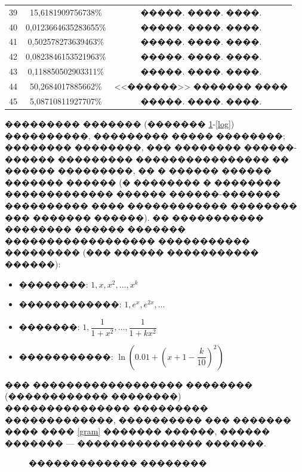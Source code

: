 \documentclass[a4paper]{article}
\begin{document}
\begin{table}[h]
\begin{center}
\begin{tabular}[t]{|c|c|c|}
      39       & 15,6181909756738\%     & �����. ����. ����.   \\
      40       & 0,0123664635283655\%   & �����. ����. ����.   \\
      41       & 0,502578273639463\%    & �����. ����. ����.   \\
      42       & 0,0823846153521963\%   & �����. ����. ����.   \\
      43       & 0,118850502903311\%    & �����. ����. ����.   \\
      44       & 50,2684017885662\%     & <<������>> ������� ����   \\
      45       & 5,08710811927707\%     & �����. ����. ����.   \\
      \hline
    \end{tabular}
  \end{center}
\end{table}



��������� ������� (������� \ref{monex}-\ref{log}) ����������, ��������� ����� ��������;
�������� ��������, ��� �������� ������-������ ��������� ���������������� �� ������ ���������,
�� � ������ ������ ������� ������ (� �������� � �������� ������������� ������ ������-������� ���������� ���� ������������ �������� ��� ������� ������).
�� ����������� �������� ������ ������� ������������������ ����������� ��������� (��� ������ ����������� ������):
\begin{itemize}
  \item ��������: $1, x, x^2,\dots , x^k$
  \item ������������: $1, e^x, e^{2x},\dots$
  \item �������: $1,\dfrac{1}{1+x^2}, \dots , \dfrac{1}{1+kx^2}$
  \item �����������: $\ln\left(0.01 + \left(x+1-\dfrac{k}{10}\right)^2\right)$
\end{itemize}
��� ������������������ �������� (������������ ��������) ��������������� ��������� �������������, ���������� ��� ������� ���� ���� \ref{gram} ������� ������, ������ ������� --- ��������������� �������.

\begin{figure}[h!]
  \noindent{}
  \caption{������������� ��������}
  \label{monex}
\end{figure}
\end{document}

